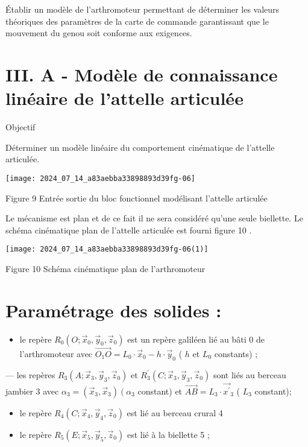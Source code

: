 Établir un modèle de l'arthromoteur permettant de déterminer les valeurs théoriques des paramètres de la carte de commande garantissant que le mouvement du genou soit conforme aux exigences.

\section*{III. A - Modèle de connaissance linéaire de l'attelle articulée}
Objectif

Déterminer un modèle linéaire du comportement cinématique de l'attelle articulée.

\begin{center}
\texttt{[image: 2024\_07\_14\_a83aebba33898893d39fg-06]}
\end{center}

Figure 9 Entrée sortie du bloc fonctionnel modélisant l'attelle articulée

Le mécanisme est plan et de ce fait il ne sera considéré qu'une seule biellette. Le schéma cinématique plan de l'attelle articulée est fourni figure 10 .

\begin{center}
\texttt{[image: 2024\_07\_14\_a83aebba33898893d39fg-06(1)]}
\end{center}

Figure 10 Schéma cinématique plan de l'arthromoteur

\section*{Paramétrage des solides :}
\begin{itemize}
  \item le repère $R_{0}\left(O ; \vec{x}_{0}, \vec{y}_{0}, \vec{z}_{0}\right)$ est un repère galiléen lié au bâti 0 de l'arthromoteur avec $\overrightarrow{O_{1} O}=L_{0} \cdot \vec{x}_{0}-h \cdot \vec{y}_{0}$ ( $h$ et $L_{0}$ constants) ;
\end{itemize}

— les repères $R_{3}\left(A ; \vec{x}_{3}, \vec{y}_{3}, \vec{z}_{0}\right)$ et $R_{3}^{\prime}\left(C ; \vec{x}_{3}, \vec{y}_{3}, \vec{z}_{0}\right)$ sont liés au berceau jambier 3 avec $\alpha_{3}=\left(\vec{x}_{3}, \vec{x}_{3}\right)\left(\alpha_{3}\right.$ constant) et $\overrightarrow{A B}=L_{3} \cdot \overrightarrow{x^{\prime}}{ }_{3}$ ( $L_{3}$ constant);

\begin{itemize}
  \item le repère $R_{4}\left(C ; \vec{x}_{4}, \vec{y}_{4}, \vec{z}_{0}\right)$ est lié au berceau crural 4

  \item le repère $R_{5}\left(E ; \vec{x}_{5}, \vec{y}_{5}, \vec{z}_{0}\right)$ est lié à la biellette 5 ;

\end{itemize}

